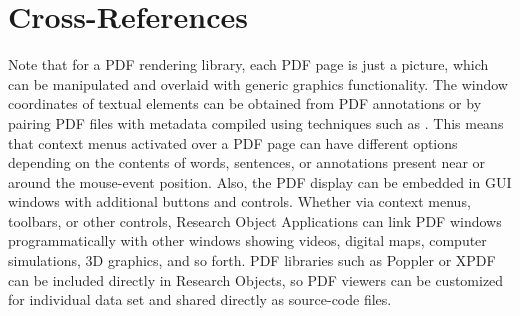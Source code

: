 
\section{Cross-References}\fbeg{}\begin{frame}{}


\begin{ftxt}[.93\textwidth]

Note that for a PDF rendering library, each PDF page is just a picture, 
which can be manipulated and overlaid with generic graphics 
functionality.  The window coordinates of textual elements 
can be obtained from PDF annotations or by pairing PDF files 
with metadata compiled using techniques such as \pdfsp{13pt}.  
This means that context menus activated over a PDF page can 
have different options depending on the contents of 
words, sentences, or annotations present near or around 
the mouse-event position.  Also, the PDF display
can be embedded in GUI windows with additional buttons and 
controls.  Whether via context menus, toolbars, or other 
controls, Research Object Applications can link PDF 
windows programmatically with other windows showing videos, 
digital maps, computer simulations, 3D graphics, and so forth.
PDF libraries such as Poppler or XPDF can be included 
directly in Research Objects, so PDF viewers   
can be customized for individual data set and 
shared directly as source-code files. 


\end{ftxt}


\end{frame}

